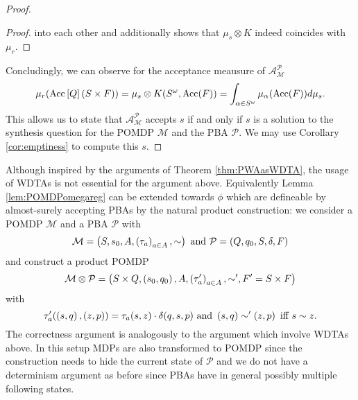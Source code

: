 \begin{proof}
\begin{proof}
    into each other and additionally shows that $\mu_{s}\otimes K$ indeed
    coincides with $\mu_{r}$.
  \end{proof}
  Concludingly, we can observe for the acceptance meausure of 
  $\mathcal{A}_{\mathcal{M}}^{\mathcal{P}}$ 
  \begin{equation*}
    \mu_{r}(\operatorname{Acc}\left[Q\right](S\times F))  
    = \mu_{s}\otimes K(S^{\omega}, \operatorname{Acc}(F))
    = \int_{\alpha\in S^{\omega}}\mu_{\alpha}(\operatorname{Acc}(F)) d\mu_{s}.
  \end{equation*}
  This allows us to state that $\mathcal{A}_{\mathcal{M}}^{\mathcal{P}}$ 
  accepts $s$ if and only if $s$ is a solution to the synthesis question for 
  the \ac{POMDP} $\mathcal{M}$ and the \ac{PBA} $\mathcal{P}$. We may use
  Corollary \ref{cor:emptiness} to compute this $s$.
\end{proof}
Although inspired by the arguments of Theorem \ref{thm:PWAasWDTA}, the usage 
of \acp{WDTA} is not essential for the argument above. Equivalently Lemma 
\ref{lem:POMDPomegareg} can be extended towards $\phi$ which
are defineable by almost-surely accepting \acp{PBA} by the natural product 
construction: we consider a \ac{POMDP} $\mathcal{M}$ and a \ac{PBA} 
$\mathcal{P}$ with
\begin{equation*}
  \mathcal{M} = \left(S, s_{0}, A, \left(\tau_{a}\right)_{a\in A}, \sim\right)
  \text{ and }
  \mathcal{P} = \left(Q, q_{0}, S, \delta, F\right)
\end{equation*}
and construct a product \ac{POMDP}
\begin{equation*}
  \mathcal{M}\otimes\mathcal{P} = \left(S\times Q, \left(s_{0}, q_{0}\right), A,
    \left(\tau'_{a}\right)_{a\in A}, \sim', F' = S\times F\right)
\end{equation*}
with
\begin{equation*}
  \tau'_{a}(\left(s, q\right), \left(z, p\right)) = \tau_{a}(s, z)\cdot\delta(q, s, p)
  \text{ and }
  \left(s, q\right)\sim'\left(z, p\right)\text{ iff }s\sim z.
\end{equation*}
The correctness argument is analogously to the argument which involve 
\acp{WDTA} above. In this setup \acp{MDP} are also transformed to \ac{POMDP} 
since the construction needs to hide the current state of $\mathcal{P}$ and we
do not have a determinism argument as before since \acp{PBA} have in general
possibly multiple following states. 
